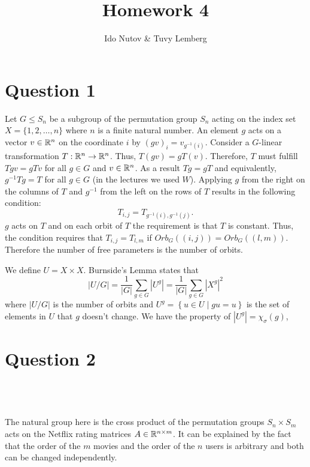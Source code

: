 \documentclass[english]{article}
\begin{document}

\title{Homework 4}
\author{Ido Nutov \& Tuvy Lemberg}
\maketitle

\section{Question 1}



Let $G\leq S_{n}$ be a subgroup of the permutation group $S_{n}$
acting on the index set $X=\ensuremath{\{1,2,\ldots,n\}}$
where $n$ is a finite natural number. An element $g$ acts on a vector
$v\in\mathbb{R}^{n}$ on the coordinate $i$ by $\left(gv\right)_{i}=v_{g^{-1}(i)}$.
Consider a $G$-linear transformation $T:\mathbb{R}^{n}\rightarrow\mathbb{R}^{n}$.
Thus, $T(gv)=gT(v)$. Therefore, $T$ must fulfill $Tgv=gTv$ for all
$g\in G$ and $v\in\mathbb{R}^{n}$. As a result $Tg=gT$ and equivalently,
$g^{-1}Tg=T$ for all $g\in G$ (in the lectures we used $W$). Applying
$g$ from the right on the columns of $T$ and $g^{-1}$ from the
left on the rows of $T$ results in the following condition: 
\begin{equation}
T_{i,j}=T_{g^{-1}(i),g^{-1}(j)}.\label{eq:q1_condition}
\end{equation}
$g$ acts on $T$ and on each orbit of $T$ the requirement is
that $T$ is constant. Thus, the condition requires that $T_{i,j}=T_{l,m}$
if $Orb_{G}\left((i,j)\right)=Orb_{G}\left((l,m)\right)$. Therefore
the number of free parameters is the number of orbits. 

We define $U=X\times X$. Burnside\textquoteright s Lemma states that
\[
\left|U\slash G\right|=\frac{1}{\left|G\right|}\sum_{g\in G}\left|U^{g}\right|=\frac{1}{\left|G\right|}\sum_{g\in G}\left|X^{g}\right|^{2}
\]
 where $\left|U\slash G\right|$ is the number of orbits and $U^{g}=\left\{ u\in U\mid gu=u\right\} $
is the set of elements in $U$ that $g$ doesn't change. We have the
property of $\left|U^{g}\right|=\chi_{\sigma}(g)$,

\section{Question 2}

\subsection{~}

The natural group here is the cross product of the permutation groups
$S_{n}\times S_{m}$ acts on the Netflix rating matrices $A\in\mathbb{R}^{n\times m}$.
It can be explained by the fact that the order of the $m$ movies
and the order of the $n$ users is arbitrary and both can be changed
independently.
\end{document}
